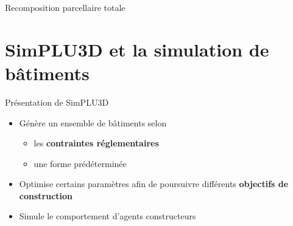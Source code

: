 \documentclass[xcolor=table]{beamer}
\begin{document}

\begin{frame}{Recomposition parcellaire totale}
\end{frame}


\section[SimPLU3D]{SimPLU3D et la simulation de bâtiments}

\begin{frame}{Présentation de SimPLU3D}
	\begin{itemize}
		\item Génère un ensemble de bâtiments selon
		\begin{itemize}
			\item les \textbf{contraintes réglementaires}
			\item une forme prédéterminée
		\end{itemize}
		\item Optimise certains paramètres afin de poursuivre différents \textbf{objectifs de construction}
		\item Simule le comportement d'agents constructeurs
	\end{itemize} 
\end{frame}
\end{document}
